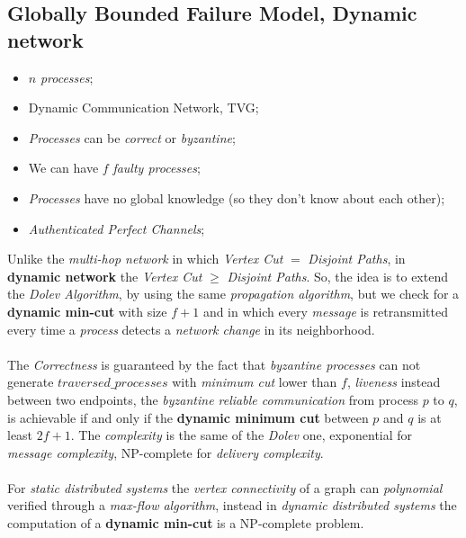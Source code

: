 \documentclass{article}
\begin{document}
\subsection{Globally Bounded Failure Model, Dynamic network}
\begin{itemize}
\item $n$ \emph{processes};
\item Dynamic Communication Network, TVG;
\item \emph{Processes} can be \emph{correct} or \emph{byzantine};
\item We can have $f$ \emph{faulty processes};
\item \emph{Processes} have no global knowledge (so they don't know about each other);
\item \emph{Authenticated Perfect Channels};
\end{itemize}
Unlike the \emph{multi-hop network} in which \emph{Vertex Cut} $=$ \emph{Disjoint Paths}, in \textbf{dynamic network} the \emph{Vertex Cut} $\geq$ \emph{Disjoint Paths}. So, the idea is to extend the \emph{Dolev Algorithm}, by using the same \emph{propagation algorithm}, but we check for a \textbf{dynamic min-cut} with size $f+1$ and in which every \emph{message} is retransmitted every time a \emph{process} detects a \emph{network change }in its neighborhood. \\\\
The \emph{Correctness} is guaranteed by the fact that \emph{byzantine processes} can not generate $traversed\_processes$ with \emph{minimum cut} lower than $f$, \emph{liveness} instead between two endpoints, the \emph{byzantine reliable communication} from process $p$ to $q$, is achievable if and only if the \textbf{dynamic minimum cut} between $p$ and $q$ is at least $2f+1$. The \emph{complexity} is the same of the \emph{Dolev} one, exponential for \emph{message complexity}, NP-complete for \emph{delivery complexity}. \\\\
For \emph{static distributed systems} the \emph{vertex connectivity} of a graph can \emph{polynomial} verified through a \emph{max-flow algorithm}, instead in \emph{dynamic distributed systems} the computation of a \textbf{dynamic min-cut} is a NP-complete problem.
\end{document}
